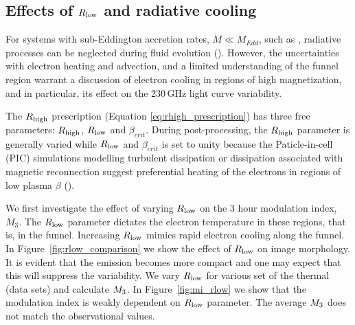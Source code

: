\subsection{Effects of \texorpdfstring{$R_\mathrm{low}$}{Rl} and radiative cooling}

For systems with sub-Eddington accretion rates, $\Dot{M}\ll\Dot{M}_{Edd}$, such as \sgra, radiative processes can be neglected during fluid evolution (\citealt{2012MNRAS.426.1928D, 10.1093/mnras/stw3116, Ryan_2017}).
However, the uncertainties with electron heating and advection, and a limited understanding of the funnel region warrant a discussion of electron cooling in regions of high magnetization, and in particular, its effect on the 230\,GHz light curve variability.

The $R_\mathrm{high}$ prescription (Equation \ref{eq:rhigh_prescription}) has three free parameters: $R_\mathrm{high}$, $R_\mathrm{low}$ and $\beta_{crit}$. During post-processing, the $R_\mathrm{high}$ parameter is generally varied while $R_\mathrm{low}$ and $\beta_{crit}$ is set to unity because the Paticle-in-cell (PIC) simulations modelling turbulent dissipation or dissipation associated with magnetic reconnection suggest preferential heating of the electrons in regions of low plasma $\beta$ (\citealt{2010MNRAS.409L.104H, Rowan_2017, 10.1093/mnras/stx2530, Rowan_2019, Kawazura771, PhysRevX.10.041050, kawazura2021energy}).

We first investigate the effect of varying $R_\mathrm{low}$ on the 3 hour modulation index, $M_{3}$. The $R_\mathrm{low}$ parameter dictates the electron temperature in these regions, that is, in the funnel. Increasing $R_\mathrm{low}$ mimics rapid electron cooling along the funnel.
In Figure~\ref{fig:rlow_comparison} we show the effect of $R_\mathrm{low}$ on image morphology. It is evident that the emission becomes more compact and one may expect that this will suppress the variability.
We vary $R_\mathrm{low}$ for various set of the thermal (\kharma data sets) and calculate $M_{3}$. In Figure~\ref{fig:mi_rlow} we show that the modulation index is weakly dependent on $R_\mathrm{low}$ parameter.
The average $M_{3}$ does not match the observational values.


